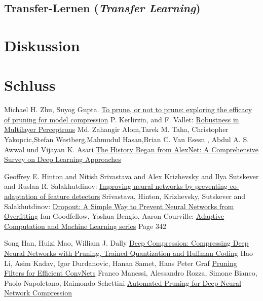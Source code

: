 \documentclass[12pt,a4paper]{scrartcl}
\numberwithin{equation}{section}
\begin{document}
\subsection{Transfer-Lernen (\textit{Transfer Learning})}

\section{Diskussion}
\section{Schluss}


\begin{thebibliography}{lem00}
		Michael H. Zhu, Suyog Gupta.
		\href{https://www.arxiv-vanity.com/papers/1710.01878/}{To prune, or not to prune: exploring the efficacy of pruning for model compression}
	P. Kerlirzin, and F. Vallet: \href{ https://www.mitpressjournals.org/doi/abs/10.1162/neco.1993.5.3.473?journalCode=neco} {Robustness in Multilayer Perceptrons}
		Md. Zahangir Alom,Tarek M. Taha, Christopher Yakopcic,Stefan Westberg,Mahmudul Hasan,Brian C. Van Esesn , Abdul A. S. Awwal und Vijayan K. Asari \href{https://arxiv.org/abs/1803.01164}{The History Began from AlexNet: A Comprehensive Survey on Deep Learning Approaches}
	
 	Geoffrey E. Hinton and Nitish Srivastava and Alex Krizhevsky and Ilya Sutskever and Ruslan R. Salakhutdinov: \href{https://arxiv.org/abs/1207.0580}{Improving neural networks by preventing co-adaptation of feature detectors}
 	Srivastava, Hinton, Krizhevsky, Sutskever and Salakhutdinov: \href{http://jmlr.org/papers/volume15/srivastava14a.old/srivastava14a.pdf}{Dropout: A Simple Way to Prevent Neural Networks from Overfitting}
Ian Goodfellow, Yoshua Bengio, Aaron Courville:
\href{https://www.amazon.com/Deep-Learning-Adaptive-Computation-Machine/dp/0262035618/ref=as_li_ss_tl?ieTF8&qid=1548018253&sr=8-3&keywords=deep+learning&linkCode=sl1&tag=inspiredalgor-20&linkId=49b3b1cce7e04bb3c9b99f2d878bf805&language=en_US}{Adaptive Computation and Machine Learning series} Page 342
 
	 Song Han, Huizi Mao, William J. Dally \href{https://arxiv.org/abs/1510.00149}{Deep Compression: Compressing Deep Neural Networks with Pruning, Trained Quantization and Huffman Coding}
 	Hao Li, Asim Kadav, Igor Durdanovic, Hanan Samet, Hans Peter Graf
 	\href{https://arxiv.org/abs/1608.08710}{Pruning Filters for Efficient ConvNets}
      Franco Manessi, Alessandro Rozza, Simone Bianco, Paolo Napoletano, Raimondo Schettini \href{https://arxiv.org/abs/1712.01721}{Automated Pruning for Deep Neural Network Compression}
      

\end{thebibliography}
\end{document}
